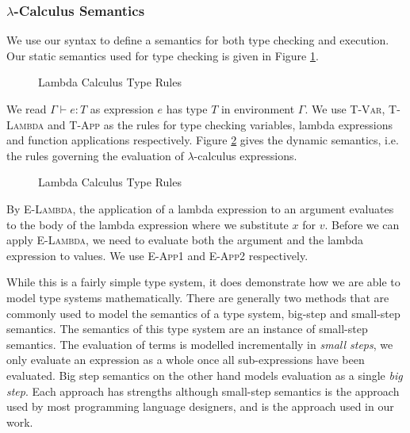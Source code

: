 \documentclass[11pt
              , a4paper
              , twoside
              , openright
              ]{report}
\numberwithin{case}{theorem}
\numberwithin{subcase}{case}
\begin{document}
\subsubsection{$\lambda$-Calculus Semantics}
We use our syntax to define a semantics for both type checking and execution. Our static semantics used for type checking is given in Figure \ref{f:lambda_type}.
\begin{figure}[h]
\caption{Lambda Calculus Type Rules}
\label{f:lambda_type}
\end{figure}
We read $\Gamma \vdash e : T$ as expression $e$ has type $T$ in environment $\Gamma$. We use \textsc{T-Var}, \textsc{T-Lambda} and \textsc{T-App} as the rules for type checking variables, lambda expressions and function applications respectively. Figure \ref{f:lambda_eval} gives the dynamic semantics, i.e. the rules governing the evaluation of $\lambda$-calculus expressions.
\begin{figure}[h]
\caption{Lambda Calculus Type Rules}
\label{f:lambda_eval}
\end{figure}
By \textsc{E-Lambda}, the application of a lambda expression to an argument evaluates to the body of the lambda expression where we substitute $x$ for $v$. Before we can apply \textsc{E-Lambda}, we need to evaluate both the argument and the lambda expression to values. We use \textsc{E-App1} and \textsc{E-App2} respectively.

While this is a fairly simple type system, it does demonstrate how we are able to model type systems mathematically. There are generally two methods that are commonly used to model the semantics of a type system, big-step \cite{Kahn:1987:NS:28220.28222} and small-step \cite{Plotkin81astructural} semantics. The semantics of this type system are an instance of small-step semantics. The evaluation of terms is modelled incrementally in \emph{small steps}, we only evaluate an expression as a whole once all sub-expressions have been evaluated. Big step semantics on the other hand models evaluation as a single \emph{big step}. Each approach has strengths although small-step semantics is the approach used by most programming language designers, and is the approach used in our work.
\end{document}
